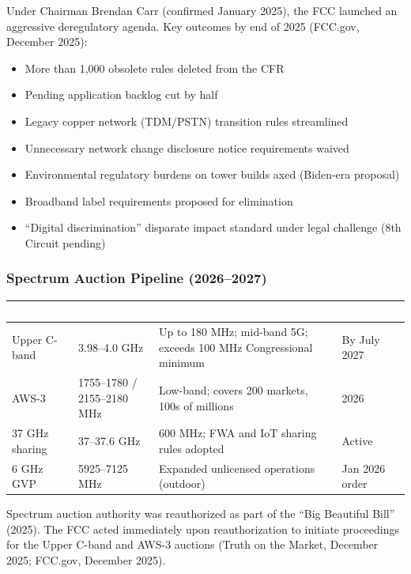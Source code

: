 \documentclass[11pt,letterpaper]{article}
\newcommand{\tableheader}[1]{\textbf{\sffamily\textcolor{white}{#1}}}
\begin{document}
Under Chairman Brendan Carr (confirmed January 2025), the FCC launched an aggressive deregulatory agenda. Key outcomes by end of 2025 (FCC.gov, December 2025):
\begin{itemize}[leftmargin=1.5em]
  \item More than 1,000 obsolete rules deleted from the CFR
  \item Pending application backlog cut by half
  \item Legacy copper network (TDM/PSTN) transition rules streamlined
  \item Unnecessary network change disclosure notice requirements waived
  \item Environmental regulatory burdens on tower builds axed (Biden-era proposal)
  \item Broadband label requirements proposed for elimination
  \item ``Digital discrimination'' disparate impact standard under legal challenge (8th Circuit pending)
\end{itemize}

\subsubsection{Spectrum Auction Pipeline (2026--2027)}

\begin{center}
\begin{tabularx}{\textwidth}{L{3cm}L{3cm}XC{2.5cm}}
\toprule
{}
\tableheader{Auction} & \tableheader{Band} & \tableheader{Description} & \tableheader{Timeline} \\
\midrule
Upper C-band & 3.98--4.0 GHz & Up to 180 MHz; mid-band 5G; exceeds 100 MHz Congressional minimum & By July 2027 \\
AWS-3 & 1755--1780 / 2155--2180 MHz & Low-band; covers 200 markets, 100s of millions & 2026 \\
37 GHz sharing & 37--37.6 GHz & 600 MHz; FWA and IoT sharing rules adopted & Active \\
6 GHz GVP & 5925--7125 MHz & Expanded unlicensed operations (outdoor) & Jan 2026 order \\
\bottomrule
\end{tabularx}
\end{center}

Spectrum auction authority was reauthorized as part of the ``Big Beautiful Bill'' (2025). The FCC acted immediately upon reauthorization to initiate proceedings for the Upper C-band and AWS-3 auctions (Truth on the Market, December 2025; FCC.gov, December 2025).
\end{document}
